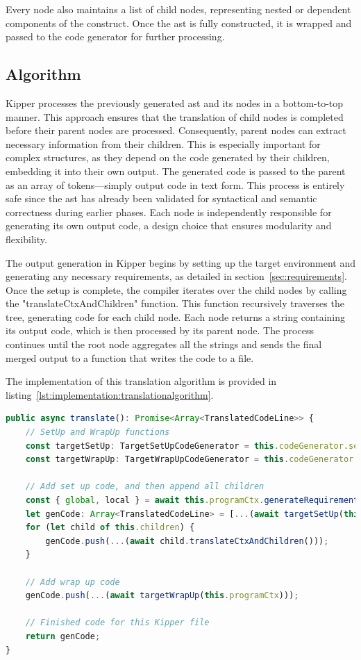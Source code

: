 Every node also maintains a list of child nodes, representing nested or dependent components of the construct. Once the \acrshort{ast} is fully constructed, it is wrapped and passed to the code generator for further processing.

\subsection{Algorithm}

Kipper processes the previously generated \acrshort{ast} and its nodes in a bottom-to-top manner. This approach ensures that the translation of child nodes is completed before their parent nodes are processed. Consequently, parent nodes can extract necessary information from their children. This is especially important for complex structures, as they depend on the code generated by their children, embedding it into their own output. The generated code is passed to the parent as an array of tokens—simply output code in text form. This process is entirely safe since the \acrshort{ast} has already been validated for syntactical and semantic correctness during earlier phases. Each node is independently responsible for generating its own output code, a design choice that ensures modularity and flexibility.

The output generation in Kipper begins by setting up the target environment and generating any necessary requirements, as detailed in section~\ref{sec:requirements}. Once the setup is complete, the compiler iterates over the child nodes by calling the "translateCtxAndChildren" function. This function recursively traverses the tree, generating code for each child node. Each node returns a string containing its output code, which is then processed by its parent node. The process continues until the root node aggregates all the strings and sends the final merged output to a function that writes the code to a file.

The implementation of this translation algorithm is provided in listing~\ref{lst:implementation:translationalgorithm}.

\begin{lstlisting}[language=TypeScript,caption=The translation algorithm,label=lst:implementation:translationalgorithm]
public async translate(): Promise<Array<TranslatedCodeLine>> {
	// SetUp and WrapUp functions
	const targetSetUp: TargetSetUpCodeGenerator = this.codeGenerator.setUp;
	const targetWrapUp: TargetWrapUpCodeGenerator = this.codeGenerator.wrapUp;

	// Add set up code, and then append all children
	const { global, local } = await this.programCtx.generateRequirements();
	let genCode: Array<TranslatedCodeLine> = [...(await targetSetUp(this.programCtx, global)), ...local];
	for (let child of this.children) {
		genCode.push(...(await child.translateCtxAndChildren()));
	}

	// Add wrap up code
	genCode.push(...(await targetWrapUp(this.programCtx)));

	// Finished code for this Kipper file
	return genCode;
}
\end{lstlisting}

